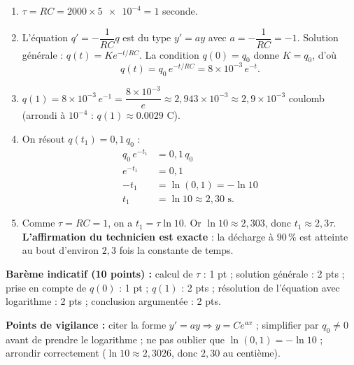 \documentclass[11pt]{article}
\begin{document}
\begin{corrige}
\begin{enumerate}
\item $\tau = RC = \num{2000} \times \num{5e-4} = 1$ seconde.
\item L'équation $q' = -\dfrac{1}{RC}q$ est du type $y' = ay$ avec $a = -\dfrac{1}{RC} = -1$. Solution générale : $q(t) = Ke^{-t/RC}$. La condition $q(0) = q_0$ donne $K = q_0$, d'où
\[ q(t) = q_0\,e^{-t/RC} = 8 \times 10^{-3}\,e^{-t}. \]
\item $q(1) = 8 \times 10^{-3}\,e^{-1} = \dfrac{8 \times 10^{-3}}{e} \approx 2{,}943 \times 10^{-3} \approx 2{,}9 \times 10^{-3}$ coulomb (arrondi à $10^{-4}$ : $q(1) \approx \num{0,0029}$ C).
\item On résout $q(t_1) = 0{,}1\,q_0$ :
\begin{align*}
q_0\,e^{-t_1} &= 0{,}1\,q_0 \\
e^{-t_1} &= 0{,}1 \\
-t_1 &= \ln(0{,}1) = -\ln 10 \\
t_1 &= \ln 10 \approx 2{,}30 \text{ s}.
\end{align*}
\item Comme $\tau = RC = 1$, on a $t_1 = \tau\ln 10$. Or $\ln 10 \approx 2{,}303$, donc $t_1 \approx 2{,}3\tau$. \textbf{L'affirmation du technicien est exacte} : la décharge à $90\,\%$ est atteinte au bout d'environ $2{,}3$ fois la constante de temps.
\end{enumerate}
\textbf{Barème indicatif (10 points) :} calcul de $\tau$ : 1 pt ; solution générale : 2 pts ; prise en compte de $q(0)$ : 1 pt ; $q(1)$ : 2 pts ; résolution de l'équation avec logarithme : 2 pts ; conclusion argumentée : 2 pts.

\textbf{Points de vigilance :} citer la forme $y' = ay \Rightarrow y = Ce^{ax}$ ; simplifier par $q_0 \neq 0$ avant de prendre le logarithme ; ne pas oublier que $\ln(0{,}1) = -\ln 10$ ; arrondir correctement ($\ln 10 \approx 2{,}3026$, donc $2{,}30$ au centième).
\end{corrige}
\end{document}
